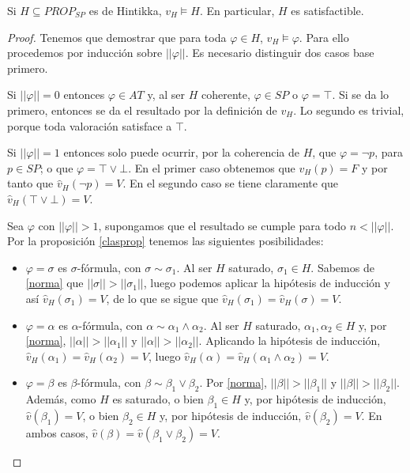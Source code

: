 \begin{prop}\label{hintisatis}
Si $H \subseteq PROP_{SP}$ es de Hintikka, $v_H \vDash H$. En particular, $H$ es satisfactible.
\end{prop}
\begin{proof}
Tenemos que demostrar que para toda $\varphi\in H$, $v_H \vDash \varphi$. Para ello procedemos por inducción sobre $||\varphi||$. Es necesario distinguir dos casos base primero.

Si $||\varphi|| = 0$ entonces $\varphi \in AT$ y, al ser $H$ coherente, $\varphi \in SP$ o $\varphi = \top$. Si se da lo primero, entonces se da el resultado por la definición de $v_H$. Lo segundo es trivial, porque toda valoración satisface a $\top$.

Si $||\varphi|| = 1$ entonces solo puede ocurrir, por la coherencia de $H$, que $\varphi = \neg p$, para $p \in SP$; o que $\varphi = \top \lor \bot$. En el primer caso obtenemos que $v_H(p) = F$ y por tanto que $\hat{v}_H(\neg p) = V$. En el segundo caso se tiene claramente que $\hat{v}_H(\top \lor \bot) = V$.

Sea $\varphi$ con $||\varphi|| > 1$, supongamos que el resultado se cumple para todo $ n<||\varphi||$. Por la proposición \ref{clasprop} tenemos las siguientes posibilidades:
\begin{itemize}
    \item $\varphi = \sigma$ es $\sigma$-fórmula, con $\sigma \sim \sigma_1$. Al ser $H$ saturado, $\sigma_1 \in H$. Sabemos de \ref{norma} que $||\sigma|| > ||\sigma_1||$, luego podemos aplicar la hipótesis de inducción y así $\hat{v}_H(\sigma_1) = V$, de lo que se sigue que $\hat{v}_H(\sigma_1) = \hat{v}_H(\sigma) = V$.
    \item $\varphi = \alpha$ es $\alpha$-fórmula, con $\alpha \sim \alpha_1 \land \alpha_2$. Al ser $H$ saturado, $\alpha_1, \alpha_2 \in H$ y, por \ref{norma},  $||\alpha|| > ||\alpha_1||$ y $||\alpha|| > ||\alpha_2||$. Aplicando la hipótesis de inducción, $\hat{v}_H(\alpha_1) = \hat{v}_H(\alpha_2)  = V$, luego $\hat{v}_H(\alpha) = \hat{v}_H(\alpha_1 \land \alpha_2) = V$.
    \item $\varphi = \beta$ es $\beta$-fórmula, con $\beta \sim \beta_1 \lor \beta_2$. Por \ref{norma},  $||\beta|| > ||\beta_1||$ y $||\beta|| > ||\beta_2||$. Además, como $H$ es saturado, o bien $\beta_1\in H$ y, por hipótesis de inducción, $\hat{v}(\beta_1)=V$, o bien $\beta_2\in H$ y, por hipótesis de inducción, $\hat{v}(\beta_2)=V$. En ambos casos, $\hat{v}(\beta)=\hat{v}(\beta_1\lor\beta_2)=V$.
\end{itemize}
\end{proof}


